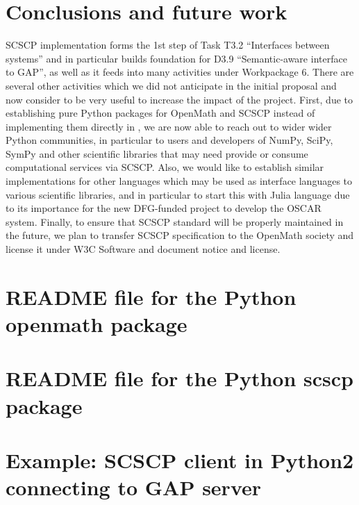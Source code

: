 \documentclass{deliverablereport}
\begin{document}
\section{Conclusions and future work}

SCSCP implementation forms the 1st step of Task T3.2 ``Interfaces
between systems'' and in particular builds foundation for D3.9
``Semantic-aware \Sage interface to GAP'', as well as it feeds into
many activities under Workpackage 6.
There are several other activities which we did not anticipate 
in the initial proposal and now consider to be very useful to
increase the impact of the project. First, due to establishing
pure Python packages for OpenMath and SCSCP instead of implementing
them directly in \Sage, we are now able to reach out to wider
wider Python communities, in particular to users and developers
of {\sf NumPy}, {\sf SciPy}, {\sf SymPy} and other scientific
libraries that may need provide or consume computational services
via SCSCP. Also, we would like to establish similar implementations
for other languages which may be used as interface languages to
various scientific libraries, and in particular to start this with
Julia language due to its importance for the new DFG-funded project
to develop the  OSCAR system. Finally, to ensure that SCSCP standard
will be properly maintained in the future, we plan to transfer
SCSCP specification to the OpenMath society and license it under 
W3C Software and document notice and license.

\printbibliography

\newpage
\appendix

\section{README file for the Python openmath package}\label{py-openmath_README}


\section{README file for the Python scscp package}\label{py-scscp_README}


\section{Example: SCSCP client in Python2 connecting to GAP server}\label{python2-to-GAP}

\end{document}
